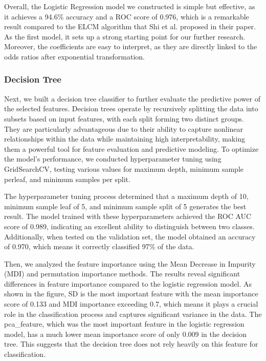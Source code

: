 \documentclass[10pt,letterpaper]{article}
\begin{document}
Overall, the Logistic Regression model we constructed is simple but effective, as it achieves a 94.6\% accuracy and a ROC score of 0.976, which is a remarkable result compared to the ELCM algorithm that Shi et al. \cite{shi2008} proposed in their paper. As the first model, it sets up a strong starting point for our further research. Moreover, the coefficients are easy to interpret, as they are directly linked to the odds ratios after exponential transformation.

\subsubsection{Decision Tree}

Next, we built a decision tree classifier to further evaluate the predictive power of the selected features. Decision trees operate by recursively splitting the data into subsets based on input features, with each split forming two distinct groups. They are particularly advantageous due to their ability to capture nonlinear relationships within the data while maintaining high interpretability, making them a powerful tool for feature evaluation and predictive modeling. To optimize the model’s performance, we conducted hyperparameter tuning using GridSearchCV, testing various values for maximum depth, minimum sample perleaf, and minimum samples per split. 

The hyperparameter tuning process determined that a maximum depth of 10, minimum sample leaf of 5, and minimum sample split of 5 generates the best result. The model trained with these hyperparameters achieved the ROC AUC score of 0.989, indicating an excellent ability to distinguish between two classes. Additionally, when tested on the validation set, the model obtained an accuracy of 0.970, which means it correctly classified 97\% of the data.

Then, we analyzed the feature importance using the Mean Decrease in Impurity (MDI) and permutation importance methods. The results reveal significant differences in feature importance compared to the logistic regression model. As shown in the figure, SD is the most important feature with the mean importance score of 0.133 and MDI importance exceeding 0.7, which means it plays a crucial role in the classification process and captures significant variance in the data. The pca\_feature, which was the most important feature in the logistic regression model, has a much lower mean importance score of only 0.009 in the decision tree. This suggests that the decision tree does not rely heavily on this feature for classification. 
\end{document}
